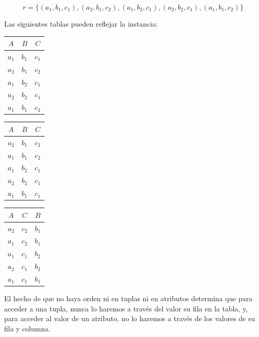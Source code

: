 \documentclass[10pt,a4paper,spanish]{report}
\begin{document}
\begin{displaymath}
r = \{(a_1,b_1,c_1), (a_2,b_1,c_2), (a_1,b_2,c_1), (a_2, b_2, c_1), (a_1,b_1,c_2)\}
\end{displaymath}

Las siguientes tablas pueden reflejar la instancia:

\begin{minipage}{0.3\textwidth}
\begin{tabular}{|c c c|}
\hline
$A$ & $B$ & $C$ \\
\hline
$a_1$ & $b_1$ & $c_1$ \\
$a_2$ & $b_1$ & $c_2$ \\
$a_1$ & $b_2$ & $c_1$ \\
$a_2$ & $b_2$ & $c_1$ \\
$a_1$ & $b_1$ & $c_2$ \\
\hline
\end{tabular}
\end{minipage}
\begin{minipage}{0.3\textwidth}
\begin{tabular}{|c c c|}
\hline
$A$ & $B$ & $C$ \\
\hline
$a_2$ & $b_1$ & $c_2$ \\
$a_1$ & $b_1$ & $c_2$ \\
$a_1$ & $b_2$ & $c_1$ \\
$a_2$ & $b_2$ & $c_1$ \\
$a_1$ & $b_1$ & $c_1$ \\
\hline
\end{tabular}
\end{minipage}
\begin{minipage}{0.3\textwidth}
\begin{tabular}{|c c c|}
\hline
$A$ & $C$ & $B$ \\
\hline
$a_2$ & $c_2$ & $b_1$ \\
$a_1$ & $c_2$ & $b_1$ \\
$a_1$ & $c_1$ & $b_2$ \\
$a_2$ & $c_1$ & $b_2$ \\
$a_1$ & $c_1$ & $b_1$ \\
\hline
\end{tabular}
\end{minipage}

El hecho de que no haya orden ni en tuplas ni en atributos determina que para acceder a una tupla, nunca lo haremos a través del valor su fila en la tabla, y, para acceder al valor de un atributo, no lo haremos a través de los valores de su fila y columna.
\end{document}
